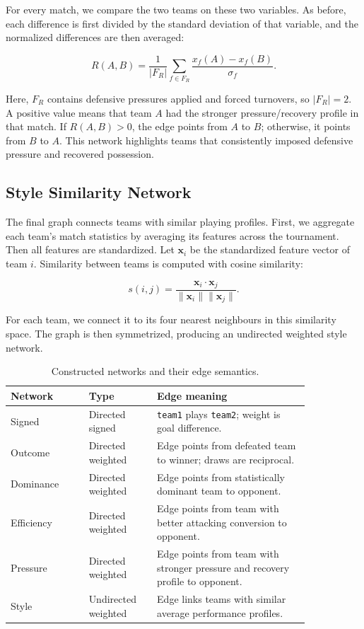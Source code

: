 \documentclass[10pt,twocolumn]{article}
\begin{document}
For every match, we compare the two teams on these two variables. As before, each difference is first divided by the standard deviation of that variable, and the normalized differences are then averaged:

\[
    R(A,B) = \frac{1}{|F_R|}\sum_{f \in F_R}
    \frac{x_f(A)-x_f(B)}{\sigma_f}.
\]

Here, $F_R$ contains defensive pressures applied and forced turnovers, so $|F_R|=2$. A positive value means that team $A$ had the stronger pressure/recovery profile in that match. If $R(A,B)>0$, the edge points from $A$ to $B$; otherwise, it points from $B$ to $A$. This network highlights teams that consistently imposed defensive pressure and recovered possession.

\subsection{Style Similarity Network}

The final graph connects teams with similar playing profiles. First, we aggregate each team's match statistics by averaging its features across the tournament. Then all features are standardized. Let $\mathbf{x}_i$ be the standardized feature vector of team $i$. Similarity between teams is computed with cosine similarity:

\[
    s(i,j) = \frac{\mathbf{x}_i \cdot \mathbf{x}_j}{\|\mathbf{x}_i\|\|\mathbf{x}_j\|}.
\]

For each team, we connect it to its four nearest neighbours in this similarity space. The graph is then symmetrized, producing an undirected weighted style network.

\begin{table}[t]
\centering
\caption{Constructed networks and their edge semantics.}
\label{tab:networks}
\small
\begin{tabular}{p{0.22\linewidth}p{0.19\linewidth}p{0.43\linewidth}}
\toprule
Network & Type & Edge meaning \\
\midrule
Signed & Directed signed & \texttt{team1} plays \texttt{team2}; weight is goal difference. \\
Outcome & Directed weighted & Edge points from defeated team to winner; draws are reciprocal. \\
Dominance & Directed weighted & Edge points from statistically dominant team to opponent. \\
Efficiency & Directed weighted & Edge points from team with better attacking conversion to opponent. \\
Pressure & Directed weighted & Edge points from team with stronger pressure and recovery profile to opponent. \\
Style & Undirected weighted & Edge links teams with similar average performance profiles. \\
\bottomrule
\end{tabular}
\end{table}
\end{document}
